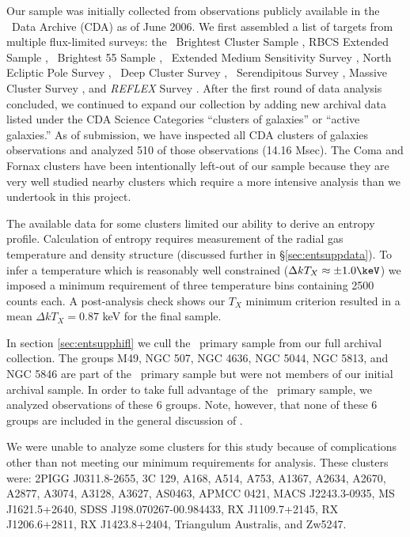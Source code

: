 Our sample was initially collected from observations publicly
available in the \chandra\ Data Archive (CDA) as of June 2006. We
first assembled a list of targets from multiple flux-limited surveys:
the \rosat\ Brightest Cluster Sample \citep{1998MNRAS.301..881E}, RBCS
Extended Sample \citep{2000MNRAS.318..333E}, \rosat\ Brightest 55
Sample \citep{1990MNRAS.245..559E, 1998MNRAS.298..416P},
\einstein\ Extended Medium Sensitivity Survey
\citep{1990ApJS...72..567G}, North Ecliptic Pole Survey
\citep{2006ApJS..162..304H}, \rosat\ Deep Cluster Survey
\citep{1995ApJ...445L..11R}, \rosat\ Serendipitous Survey
\citep{1998ApJ...502..558V}, Massive Cluster Survey
\citep{2001ApJ...553..668E}, and {\it{REFLEX}} Survey
\citep{reflex}. After the first round of data analysis concluded, we
continued to expand our collection by adding new archival data listed
under the CDA Science Categories ``clusters of galaxies'' or ``active
galaxies.'' As of submission, we have inspected all CDA clusters of
galaxies observations and analyzed 510 of those observations (14.16
Msec). The Coma and Fornax clusters have been intentionally left-out
of our sample because they are very well studied nearby clusters which
require a more intensive analysis than we undertook in this project.

The available data for some clusters limited our ability to derive an
entropy profile. Calculation of entropy requires measurement of the
radial gas temperature and density structure (discussed further in
\S\ref{sec:entsuppdata}). To infer a temperature which is reasonably well
constrained ($\Delta kT_X \approx \pm 1.0 \keV$) we imposed a minimum
requirement of three temperature bins containing 2500 counts each. A
post-analysis check shows our $T_X$ minimum criterion resulted in a
mean $\Delta kT_X = 0.87$ keV for the final sample.

In section \ref{sec:entsupphifl} we cull the \hifl\ primary sample
\citep{hiflugcs1, hiflugcs2} from our full archival collection. The
groups M49, NGC 507, NGC 4636, NGC 5044, NGC 5813, and NGC 5846 are
part of the \hifl\ primary sample but were not members of our initial
archival sample. In order to take full advantage of the \hifl\ primary
sample, we analyzed observations of these 6 groups. Note, however,
that none of these 6 groups are included in the general discussion of
\accept.

We were unable to analyze some clusters for this study because of
complications other than not meeting our minimum requirements for
analysis. These clusters were: 2PIGG J0311.8-2655, 3C 129, A168, A514,
A753, A1367, A2634, A2670, A2877, A3074, A3128, A3627, AS0463, APMCC
0421, MACS J2243.3-0935, MS J1621.5+2640, SDSS J198.070267-00.984433,
RX J1109.7+2145, RX J1206.6+2811, RX J1423.8+2404, Triangulum
Australis, and Zw5247.

